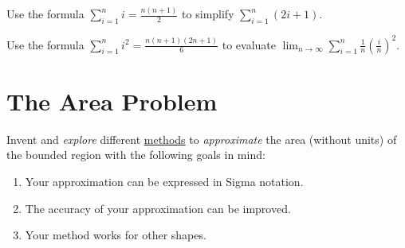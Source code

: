 \documentclass[../main.tex]{subfiles}
\begin{document}
\begin{example}
  Use the formula \(\sum_{i=1}^{n} i = \frac{n(n+1)}{2}\) to simplify \(\sum_{i=1}^{n}(2i + 1)\).
\end{example}
\clearpage

\begin{example}
  Use the formula \(\sum_{i=1}^{n} i^{2} = \frac{n(n+1)(2n+1)}{6}\) to evaluate \(\lim_{n \to \infty} \sum_{i=1}^{n} \frac{1}{n} \left( \frac{i}{n} \right)^{2}\).
\end{example}
\vfill
\clearpage

\section{The Area Problem}
Invent and \emph{explore} different \underline{methods} to \emph{approximate} the area (without units) of the bounded region with the following goals in mind:
\begin{enumerate}
  \item Your approximation can be expressed in Sigma notation. 
  \item The accuracy of your approximation can be improved.
  \item Your method works for other shapes. 
\end{enumerate}

%
%
%
%
%
\end{document}
